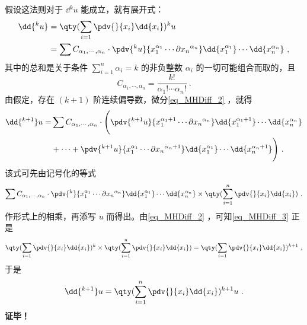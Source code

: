  假设这法则对于 $\dd{^k u}$ 能成立，就有展开式：
 \begin{equation}\label{eq_MHDiff_2}
 \begin{aligned}
 \dd{^k u}&=\qty(\sum_{i=1}\pdv{}{x_i}\dd{x_i})^k u\\
 &=\sum C_{\alpha_1,\cdots,\alpha_n}\cdot\pdv{^k u}{x_1^{\alpha_1}\cdots\partial{x_n}^{\alpha_n}}\dd{x_1^{\alpha_1}}\cdots\dd{x_n^{\alpha_n}}~,
 \end{aligned}
 \end{equation}
 其中的总和是关于条件 $\sum_{i=1}^n\alpha_i=k$ 的非负整数 $\alpha_i$ 的一切可能组合而取的，且
 \begin{equation}
 C_{\alpha_1,\cdots,\alpha_n}=\frac{k!}{\alpha_1!\cdots\alpha_n!}~.
 \end{equation}
 由假定，存在 $(k+1)$ 阶连续偏导数，微分\autoref{eq_MHDiff_2} ，就得
 \begin{equation}
  \begin{aligned}
 \dd{^{k+1}}u=&\sum C_{\alpha_1,\cdots,\alpha_n}\cdot\Bigg(\pdv{^{k+1} u}{x_1^{\alpha_1+1}\cdots\partial{x_n}^{\alpha_n}}\dd{x_1^{\alpha_1+1}}\cdots\dd{x_n^{\alpha_n}}\\
 &+\cdots+\pdv{^{k+1} u}{x_1^{\alpha_1}\cdots\partial{x_n}^{\alpha_n+1}}\dd{x_1^{\alpha_1}}\cdots\dd{x_n^{\alpha_n+1}}\Bigg)~.
 \end{aligned}
 \end{equation}
 该式可先由记号化的等式
 \begin{equation}\label{eq_MHDiff_3}
 \sum C_{\alpha_1,\cdots,\alpha_n}\cdot\pdv{^{k} }{x_1^{\alpha_1}\cdots\partial{x_n}^{\alpha_n}}\dd{x_1^{\alpha_1}}\cdots\dd{x_n^{\alpha_n}}\times\qty(\sum_{i=1}^n\pdv{}{x_i}\dd{x_i})~.
 \end{equation}
 作形式上的相乘，再添写 $u$ 而得出。由\autoref{eq_MHDiff_2} ，可知\autoref{eq_MHDiff_3} 正是
 \begin{equation}
 \qty(\sum_{i=1}\pdv{}{x_i}\dd{x_i})^k\times\qty(\sum_{i=1}^n\pdv{}{x_i}\dd{x_i})=\qty(\sum_{i=1}\pdv{}{x_i}\dd{x_i})^{k+1}~,
 \end{equation}
 于是
 \begin{equation}
 \dd{^{k+1}}u=\qty(\sum_{i=1}^n \pdv{}{x_i}\dd{x_i})^{k+1}u~.
 \end{equation}
 \textbf{证毕！}
